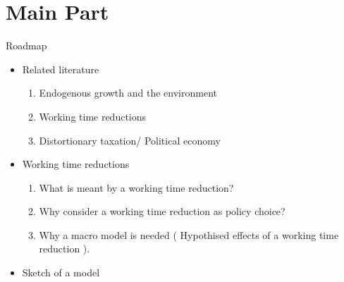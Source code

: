 \documentclass[11pt,aspectratio=169]{beamer}
\begin{document}
\section{Main Part}
\begin{frame}{Roadmap}
\begin{itemize}
\item Related literature %
\begin{enumerate}
\item Endogenous growth and the environment
\item Working time reductions
\item Distortionary taxation/ Political economy
\end{enumerate}
\item Working time reductions %
\begin{enumerate}
	\item What is meant by a working time reduction? 
\item Why consider a working time reduction as policy choice? %
\item Why a macro model is needed ( Hypothised effects of a working time reduction ).
\end{enumerate}
\item Sketch of a model %
\end{itemize}
\end{frame}
\end{document}
